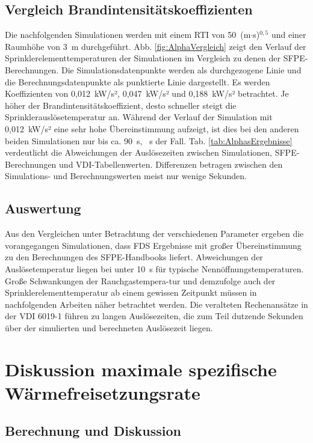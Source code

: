 \FloatBarrier
\clearpage
\subsection{Vergleich  Brandintensitätskoeffizienten}

Die nachfolgenden Simulationen werden mit einem RTI von 50~(m$\cdot$s)$^{0,5}$ und einer Raumhöhe von 3~m durchgeführt. Abb. \ref{fig:AlphaVergleich} zeigt den Verlauf der Sprinklerelementtemperaturen der Simulationen im Vergleich zu denen der SFPE-Berechnungen.
Die Simulationsdatenpunkte werden als durchgezogene Linie und die Berechnungsdatenpunkte als punktierte Linie dargestellt. Es werden Koeffizienten von 0,012~kW/s², 0,047~kW/s² und  0,188~kW/s² betrachtet. Je höher der Brandintensitätskoeffizient, desto schneller steigt die Sprinklerauslösetemperatur an.
Während der Verlauf der Simulation mit 0,012~kW/s² eine sehr hohe Übereinstimmung aufzeigt, ist dies bei den anderen beiden Simulationen nur bis ca. 90~s, ~s der Fall. Tab. \ref{tab:AlphasErgebnisse} verdeutlicht die Abweichungen der Auslösezeiten zwischen Simulationen, SFPE-Berechnungen und VDI-Tabellenwerten. Differenzen betragen zwischen den Simulations- und Berechnungswerten meist nur wenige Sekunden.


\subsection{Auswertung}

Aus den Vergleichen unter Betrachtung der verschiedenen Parameter ergeben die vorangegangen Simulationen, dass FDS Ergebnisse mit großer Übereinstimmung zu den Berechnungen des SFPE-Handbooks liefert. Abweichungen der Auslösetemperatur liegen bei unter 10~s für typische Nennöffnungstemperaturen. Große Schwankungen der Rauch\-gas\-tem\-pe\-ra-tur und demzufolge auch der Sprinklerelementtemperatur ab einem gewissen Zeitpunkt müssen in nachfolgenden Arbeiten näher betrachtet werden. Die veralteten Rechenansätze in der VDI 6019-1 führen zu langen Auslösezeiten, die zum Teil dutzende Sekunden über der simulierten und berechneten Auslösezeit liegen.
\clearpage


\section{Diskussion maximale spezifische Wärmefreisetzungsrate}
\label{sec:maxWaermefreisetzungsrate}
\subsection{Berechnung und Diskussion}

